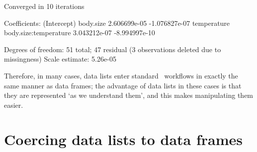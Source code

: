 \documentclass[a4paper]{report}
\begin{document}
\begin{article}
\begin{Schunk}
\begin{Soutput}
Converged in 10 iterations

Coefficients:
          (Intercept)             body.size 
         2.606699e-05         -1.076827e-07 
          temperature body.size:temperature 
         3.043212e-07         -8.994997e-10 

Degrees of freedom: 51 total; 47 residual
  (3 observations deleted due to missingness)
Scale estimate: 5.26e-05 
\end{Soutput}
\end{Schunk}
Therefore, in many cases, data lists enter standard \R\ workflows in exactly the same manner as data frames; the advantage of data lists in these cases is that they are represented `as we understand them', and this makes manipulating them easier.

\section{Coercing data lists to data frames}



\end{article}
\end{document}
